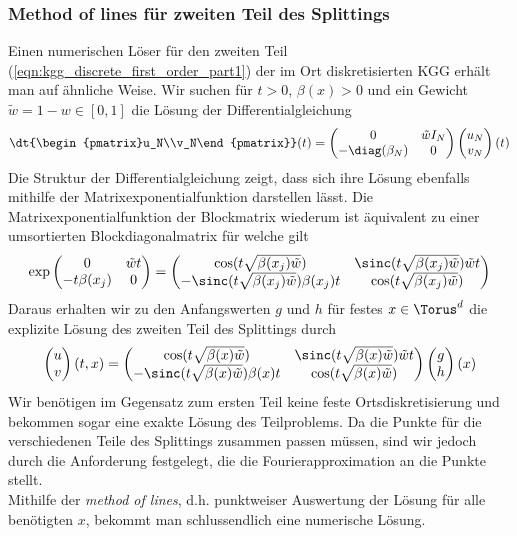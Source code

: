 \subsubsection*{Method of lines für zweiten Teil des Splittings}
Einen numerischen Löser für den zweiten Teil (\ref{eqn:kgg_discrete_first_order_part1}) der im Ort diskretisierten KGG erhält man auf ähnliche Weise. Wir suchen für $t>0$, $\beta(x)>0$ und ein Gewicht $\tilde{w}=1-w\in [0,1]$ die Lösung der Differentialgleichung
\begin{equation*}
\dt{\begin{pmatrix}u_N\\v_N\end{pmatrix}}(t)=
\begin{pmatrix}0 & \tilde{w}I_N\\ -\diag({\beta_N}) & 0\end{pmatrix}
\begin{pmatrix}u_N\\v_N\end{pmatrix}(t)
\end{equation*}
Die Struktur der Differentialgleichung zeigt, dass sich ihre Lösung ebenfalls mithilfe der Matrixexponentialfunktion darstellen lässt. Die Matrixexponentialfunktion der Blockmatrix wiederum ist äquivalent zu einer umsortierten Blockdiagonalmatrix für welche gilt
\[\exp\begin{pmatrix}0 & \tilde{w}t\\ -t\beta(x_j) & 0\end{pmatrix}=
\begin{pmatrix}\cos(t\sqrt{\beta(x_j)\tilde{w}}) & \sinc(t\sqrt{\beta(x_j)\tilde{w}})\tilde{w}t\\
-\sinc(t\sqrt{\beta(x_j)\tilde{w}})\beta(x_j)t & \cos(t\sqrt{\beta(x_j)\tilde{w}})\end{pmatrix}\]
Daraus erhalten wir zu den Anfangswerten $g$ und $h$ für festes $x\in \Torus^d$ die explizite Lösung des zweiten Teil des Splittings durch
\[\begin{pmatrix}u\\v\end{pmatrix}(t,x)=
\begin{pmatrix}\cos(t\sqrt{\beta(x)\tilde{w}}) & \sinc(t\sqrt{\beta(x)\tilde{w}})\tilde{w}t\\
-\sinc(t\sqrt{\beta(x)\tilde{w}})\beta(x)t & \cos(t\sqrt{\beta(x)\tilde{w}})\end{pmatrix}
\begin{pmatrix}g\\h\end{pmatrix}(x)\]
Wir benötigen im Gegensatz zum ersten Teil keine feste Ortsdiskretisierung und bekommen sogar eine exakte Lösung des Teilproblems. Da die Punkte für die verschiedenen Teile des Splittings zusammen passen müssen, sind wir jedoch durch die Anforderung festgelegt, die die Fourierapproximation an die Punkte stellt.\\
Mithilfe der \emph{method of lines}, d.h. punktweiser Auswertung der Lösung für alle benötigten $x$, bekommt man schlussendlich eine numerische Lösung.
